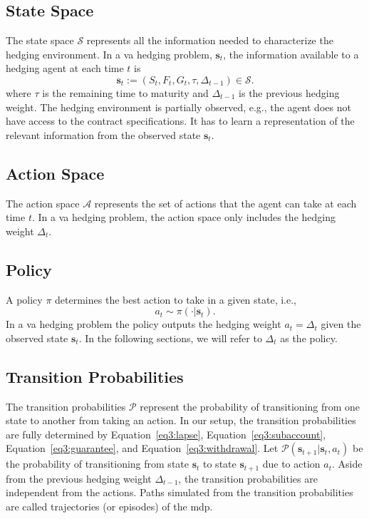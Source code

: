 \subsection{State Space}

The state space $\mathcal{S}$ represents all the information needed to characterize the hedging environment.
In a \gls{va} hedging problem, $\mathbf{s}_t$, the information available to a hedging agent at each time $t$ is 
$$\mathbf{s}_t := (S_t, F_t, G_t, \tau, \Delta_{t-1}) \in \mathcal{S}.$$
where $\tau$ is the remaining time to maturity and $\Delta_{t-1}$ is the previous hedging weight.
The hedging environment is partially observed, e.g., the agent does not have access to the contract specifications.
It has to learn a representation of the relevant information from the observed state $\mathbf{s}_t$.

\subsection{Action Space}

The action space $\mathcal{A}$ represents the set of actions that the agent can take at each time $t$.
In a \gls{va} hedging problem, the action space only includes the hedging weight $\Delta_t$.

\subsection{Policy}

A policy $\pi$ determines the best action to take in a given state, i.e.,
$$a_t \sim \pi(\cdot|\mathbf{s}_t).$$
In a \gls{va} hedging problem the policy outputs the hedging weight $a_t = \Delta_t$ given the observed state $\mathbf{s}_t$.
In the following sections, we will refer to $\Delta_t$ as the policy.

\subsection{Transition Probabilities}

The transition probabilities $\mathcal{P}$ represent the probability of transitioning from one state to another from taking an action.
In our setup, the transition probabilities are fully determined by Equation~\eqref{eq3:lapse}, Equation~\eqref{eq3:subaccount}, Equation~\eqref{eq3:guarantee}, and Equation~\eqref{eq3:withdrawal}.
Let $\mathcal{P}(\mathbf{s}_{t+1}|\mathbf{s}_t, a_t)$ be the probability of transitioning from state $\mathbf{s}_t$ to state $\mathbf{s}_{t+1}$ due to action $a_t$.
Aside from the previous hedging weight $\Delta_{t-1}$, the transition probabilities are independent from the actions.
Paths simulated from the transition probabilities are called trajectories (or episodes) of the \gls{mdp}.


